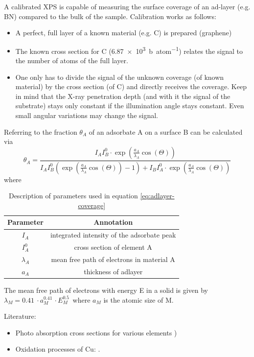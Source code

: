A calibrated XPS is capable of measuring the surface coverage of an ad-layer (e.g. BN) compared to the bulk of the sample. Calibration works as follows:
\begin{itemize}
 \item A perfect, full layer of a known material (e.g. C) is prepared (graphene)
 \item The known cross section for C (\SI{6,87e3}{\barn\per atom})\cite{henke_x-ray_1993} relates the signal to the number of atoms of the full layer.
 \item One only has to divide the signal of the unknown coverage (of known material) by the cross section (of C) and directly receives the coverage. Keep in mind that the X-ray penetration depth (and with it the signal of the substrate) stays only constant if the illumination angle stays constant. Even small angular variations may change the signal.
\end{itemize}
Referring to \cite{ertl_low_1986} the fraction $\theta_A$ of an adsorbate A on a surface B can be calculated via
\begin{equation}\label{eq:adlayer-coverage}
 \theta_A=\frac{I_AI_B^0\cdot \exp(\frac{a_A}{\lambda_A}\cos(\Theta))}{I_AI_B^0( \exp(\frac{a_A}{\lambda_A}\cos(\Theta))-1)+I_BI_A^0\cdot \exp(\frac{a_A}{\lambda_A}\cos(\Theta))}
\end{equation}
where 
\begin{table}[h!]\centering
\caption{Description of parameters used in equation \ref{eq:adlayer-coverage}}
 \begin{tabular}{cc}
  Parameter & Annotation \\ \hline \hline
  $I_A$	& integrated intensity of the adsorbate peak \\
  $I_A^0$ & cross section of element A \\
  $\lambda_A$ & mean free path of electrons in material A \\
  $a_A$ & thickness of adlayer \\
 \end{tabular}
\end{table}
The mean free path of electrons with energy E in a solid is given by $\lambda_M=\SI{0,41}{}\cdot a_M^{\SI{0,41}{}}\cdot E_M^{\SI{0,5}{}} $ where $a_M$ is the atomic size of M. 

Literature:
\begin{itemize}
 \item Photo absorption cross sections for various elements \cite{henke_x-ray_1993})
 \item Oxidation processes of Cu: \cite{deroubaix_x-ray_1992}.
\end{itemize}